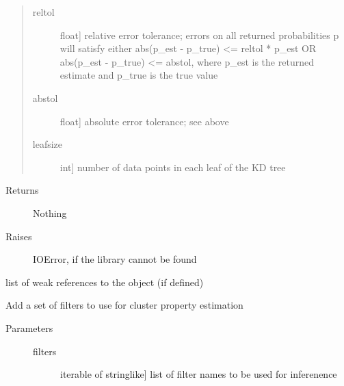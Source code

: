 \documentclass[letterpaper,10pt,english]{sphinxmanual}
\begin{document}
\begin{fulllineitems}
\begin{fulllineitems}
\begin{description}
\begin{quote}
\begin{description}
\item[{reltol}] \leavevmode{[}float{]}
relative error tolerance; errors on all returned
probabilities p will satisfy either
abs(p\_est - p\_true) \textless{}= reltol * p\_est   OR
abs(p\_est - p\_true) \textless{}= abstol,
where p\_est is the returned estimate and p\_true is the
true value

\item[{abstol}] \leavevmode{[}float{]}
absolute error tolerance; see above

\item[{leafsize}] \leavevmode{[}int{]}
number of data points in each leaf of the KD tree

\end{description}
\end{quote}
\begin{description}
\item[{Returns}] \leavevmode
Nothing

\item[{Raises}] \leavevmode
IOError, if the library cannot be found

\end{description}

\end{description}

\end{fulllineitems}


\begin{fulllineitems}
\label{\detokenize{sfr_slug:slugpy.sfr_slug.sfr_slug.__weakref__}}
list of weak references to the object (if defined)

\end{fulllineitems}


\begin{fulllineitems}
\label{\detokenize{sfr_slug:slugpy.sfr_slug.sfr_slug.add_filters}}
Add a set of filters to use for cluster property estimation
\begin{description}
\item[{Parameters}] \leavevmode\begin{description}
\item[{filters}] \leavevmode{[}iterable of stringlike{]}
list of filter names to be used for inferenence


\end{description}
\end{description}
\end{fulllineitems}
\end{fulllineitems}
\end{document}
